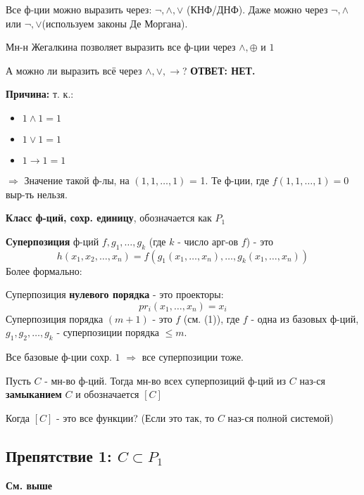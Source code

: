 Все ф-ции можно выразить через: $\neg, \land, \lor$ (КНФ/ДНФ). Даже можно через $\neg, \land$ или $\neg, \lor$(используем законы Де Моргана).

Мн-н Жегалкина позволяет выразить все ф-ции через $\land, \oplus $ и $1$

А можно ли выразить всё через $\land, \lor, \rightarrow$? \textbf{ОТВЕТ: НЕТ.}

\textbf{Причина:} т. к.:
\begin{itemize}
  \item $1 \land 1 = 1$
  \item $1 \lor 1 = 1$
  \item $1 \rightarrow 1 = 1$
\end{itemize}
$\Rightarrow$ Значение такой ф-лы, на $(1, 1, \ldots, 1)$ = 1. Те ф-ции, где $f(1, 1, \ldots, 1) = 0$ выр-ть нельзя.

\begin{symb}
\textbf{Класс ф-ций, сохр. единицу}, обозначается как $P_1$
\end{symb}

\begin{definition}
\textbf{Суперпозиция} ф-ций $f, g_1, \ldots, g_k$ (где $k$ - число арг-ов $f$) - это
\begin{equation}
  h(x_1, x_2, \ldots , x_n) = f(g_1(x_1, \ldots, x_n), \ldots, g_k(x_1, \ldots, x_n))
\end{equation}
Более формально:

Суперпозиция \textbf{нулевого порядка} - это проекторы:
\[
pr_{i}(x_1, \ldots, x_n) = x_i
\] 
Суперпозиция порядка $(m + 1)$ - это $f$ (см. (1)), где $f$ - одна из базовых ф-ций, $g_1, g_2, \ldots , g_k$ - суперпозиции порядка $\leq m$.
\end{definition}
\begin{theorem}
Все базовые ф-ции сохр. $1$ $\Rightarrow$ все суперпозиции тоже.
\end{theorem}

\begin{definition}
Пусть $C$ - мн-во ф-ций. Тогда мн-во всех суперпозиций ф-ций из $C$ наз-ся \textbf{замыканием }$C$ и обозначается $[C]$
\end{definition}

Когда $[C]$ - это все функции? (Если это так, то $C$ наз-ся полной системой)

\subsection{Препятствие 1: $C \subset P_1$}
\textbf{См. выше}

